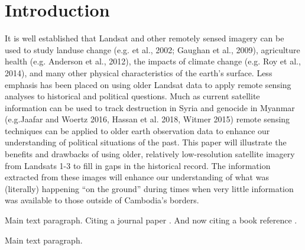\section{Introduction}
It is well established that Landsat and other remotely sensed imagery can be used to study landuse change (e.g. \Seto et al., 2002; Gaughan et al., 2009), agriculture health (e.g. Anderson et al., 2012), the impacts of climate change (e.g. Roy et al., 2014), and many other physical characteristics of the earth's surface.  
Less emphasis has been placed on using older Landsat data to apply remote sensing analyses to historical and political questions. Much as current satellite information can be used to track destruction in Syria and genocide in Myanmar (e.g.Jaafar and Woertz 2016, Hassan et al. 2018, Witmer 2015) remote sensing techniques can be applied to older earth observation data to enhance our understanding of political situations of the past.  This paper will illustrate the benefits and drawbacks of using older, relatively low-resolution satellite imagery from Landsats 1-3 to fill in gaps in the historical record.
The information extracted from these images will enhance our understanding of what was (literally) happening “on the ground” during times when very little information was available to those outside of Cambodia’s borders.


Main text paragraph. Citing a journal paper \cite{ref-journal}. And now citing a book reference \cite{ref-book}.


Main text paragraph.
